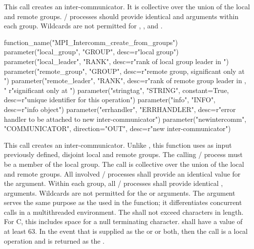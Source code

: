 \noindent This call creates an inter-communicator. It is collective
over the union of the local and remote groups. \MPI/ processes should
provide identical  and 
arguments within each group.
Wildcards are not permitted for
, , and .

%
\begin{mpi-binding}
    function_name("MPI_Intercomm_create_from_groups")
    parameter("local_group", "GROUP", desc=r"local group")
    parameter("local_leader", "RANK", desc=r"rank of local group leader in ")
    parameter("remote_group", "GROUP", desc=r"remote group, significant only at ")
    parameter("remote_leader", "RANK", desc=r"rank of remote group leader in , "
                                            r"significant only at ")
    parameter("stringtag", "STRING", constant=True, desc=r"unique identifier for this operation")
    parameter("info", "INFO", desc=r"info object")
    parameter("errhandler", "ERRHANDLER", desc=r"error handler to be attached to new inter-communicator")
    parameter("newintercomm", "COMMUNICATOR", direction="OUT", desc=r"new inter-communicator")
\end{mpi-binding}

\noindent This call creates an inter-communicator.
Unlike , this function uses as input previously defined, disjoint local and remote groups.
The calling \MPI/ process must be a member of the local group.
The call is collective over the union of the local and remote groups.
All involved \MPI/ processes shall provide an identical value for the  argument.
Within each group, all \MPI/ processes shall provide identical ,  arguments.
Wildcards are not permitted for the  or  arguments.
The  argument serves the same purpose as the  used in the  function;
it differentiates concurrent calls in a multithreaded environment.
The  shall not exceed  characters in length.
For C, this includes space for a null terminating character.
 shall have a value of at least 63.
In the event that  is supplied as the  or  or both,
then the call is a local operation and  is returned as the .

